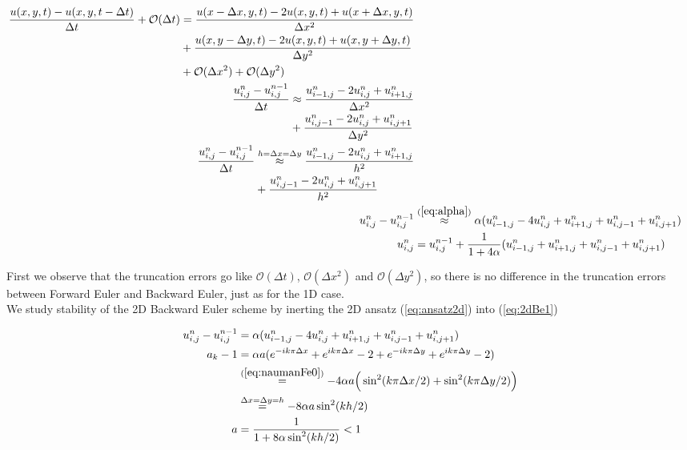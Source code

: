 \documentclass{article}
\begin{document}
\begin{subequations}
	\begin{align}
		\begin{split}
			\frac{u(x,y, t) - u(x,y,t - \Delta t)}{\Delta t} + \mathcal{O}(\Delta t) &= \frac{u(x - \Delta x,y, t) 
				- 2u(x,y,t) + u(x+ \Delta x,y, t)}{\Delta x^2} \\
			&+ \frac{u(x,y - \Delta y, t) - 2u(x,y,t) + u(x,y+ \Delta y, t)}{\Delta y^2}\\
			&+ \mathcal{O}(\Delta x^2) + \mathcal{O}(\Delta y^2)
		\end{split}\\
		\begin{split}
		\frac{u_{i,j}^n - u_{i,j}^{n-1}}{\Delta t}  &\approx \frac{u_{i-1,j}^{n} 
			- 2u_{i,j}^n + u_{i+1,j}^n}{\Delta x^2} \\
		&+ \frac{u_{i,j-1}^n - 2u_{i,j}^n + u_{i,j+1}^n}{\Delta y^2}
		\end{split}\\
		\begin{split}
			\frac{u_{i,j}^n - u_{i,j}^{n-1}}{\Delta t} &\stackrel{h = \Delta x = \Delta y}{\approx} \frac{u_{i-1,j}^{n} 
			- 2u_{i,j}^n + u_{i+1,j}^n}{h^2} \\
			&+ \frac{u_{i,j-1}^n - 2u_{i,j}^n + u_{i,j+1}^n}{h^2}
		\end{split}\\				
		u_{i,j}^n - u_{i,j}^{n-1}  &\stackrel{(\ref{eq:alpha})}{\approx} \alpha (u_{i-1,j}^{n} 
			- 4u_{i,j}^n + u_{i+1,j}^n + u_{i,j-1}^n + u_{i,j+1}^n)\label{eq:2dBe1}\\
		u_{i,j}^n &= u_{i,j}^{n-1}  + \frac{1}{1+4\alpha}(u_{i-1,j}^{n} 
		+ u_{i+1,j}^n + u_{i,j-1}^n + u_{i,j+1}^n)\label{eq:2dBe}
	\end{align}
\end{subequations}

First we observe that the truncation errors go like $\mathcal{O}(\Delta t)$, $\mathcal{O}(\Delta x^2)$ and $\mathcal{O}(\Delta y^2)$, so there is no difference in the truncation errors between Forward Euler and Backward Euler, just as for the 1D case.\\

We study stability of the 2D Backward Euler scheme by inerting the 2D ansatz (\ref{eq:ansatz2d}) into
(\ref{eq:2dBe1})

\begin{subequations}
	\begin{align}
	u_{i,j}^n - u_{i,j}^{n-1} 
	&=
	\alpha (u_{i-1,j}^{n} 
	- 4u_{i,j}^n + u_{i+1,j}^n + u_{i,j-1}^n + u_{i,j+1}^n)\\
	a_k - 1 &= \alpha a (e^{-ik \pi \Delta x} + e^{ik \pi \Delta x} -2 + e^{-ik \pi \Delta y} + e^{ik \pi \Delta y} -2 )\\
	&\stackrel{(\ref{eq:naumanFe0})}{=} - 4 \alpha a \Big(\sin^2(k \pi \Delta x/2) +  \sin^2(k \pi \Delta y/2)\Big)\\
	&\stackrel{\Delta x = \Delta y = h}{=} -8 \alpha a \sin^2(kh/2)\\
	a &= \frac{1}{1+ 8 \alpha \sin^2(kh/2)} < 1\label{eq:2dBeStability}
	\end{align}
\end{subequations}
\end{document}

